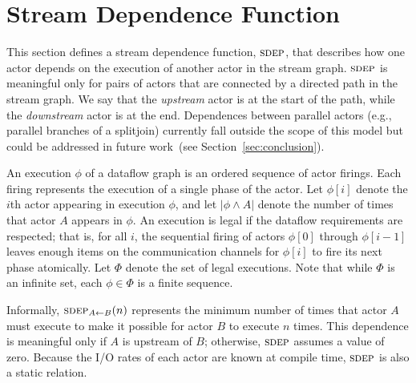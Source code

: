 
\section{Stream Dependence Function}
\label{sec:sdep}

This section defines a stream dependence function, $\textsc{sdep}$, that
describes how one actor depends on the execution of another actor in
the stream graph.  $\textsc{sdep}$ is meaningful only for pairs of actors that
are connected by a directed path in the stream graph.  We say that the
{\it upstream} actor is at the start of the path, while the {\it
downstream} actor is at the end.  Dependences between parallel actors
(e.g., parallel branches of a splitjoin) currently fall outside the
scope of this model but could be addressed in future work~(see
Section~\ref{sec:conclusion}).

An execution $\phi$ of a dataflow graph is an ordered sequence of
actor firings.  Each firing represents the execution of a single phase
of the actor.  Let $\phi[i]$ denote the $i$th actor appearing in
execution $\phi$, and let $|\phi \wedge A|$ denote the number of times
that actor $A$ appears in $\phi$.  An execution is legal if the
dataflow requirements are respected; that is, for all $i$, the
sequential firing of actors $\phi[0]$ through $\phi[i-1]$ leaves
enough items on the communication channels for $\phi[i]$ to fire its
next phase atomically.  Let $\Phi$ denote the set of legal executions.
Note that while $\Phi$ is an infinite set, each $\phi \in \Phi$ is a
finite sequence.

Informally, $\sdepf{A}{B}(n)$ represents the minimum number of times
that actor $A$ must execute to make it possible for actor $B$ to
execute $n$ times.  This dependence is meaningful only if $A$ is
upstream of $B$; otherwise, $\textsc{sdep}$ assumes a value of zero.  Because
the I/O rates of each actor are known at compile time, $\textsc{sdep}$ is also
a static relation.


